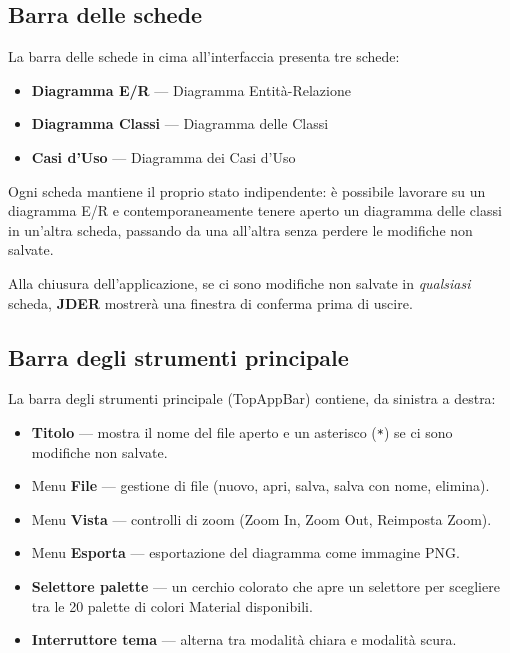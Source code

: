 \documentclass[a4paper,11pt]{article}
\newcommand{\uielement}[1]{\textbf{#1}}
\newcommand{\jder}{\textbf{JDER}}
\begin{document}
\subsection{Barra delle schede}

La barra delle schede in cima all'interfaccia presenta tre schede:

\begin{itemize}
  \item \uielement{Diagramma E/R} --- Diagramma Entità-Relazione
  \item \uielement{Diagramma Classi} --- Diagramma delle Classi
  \item \uielement{Casi d'Uso} --- Diagramma dei Casi d'Uso
\end{itemize}

Ogni scheda mantiene il proprio stato indipendente: è possibile lavorare su un diagramma E/R e
contemporaneamente tenere aperto un diagramma delle classi in un'altra scheda, passando da una
all'altra senza perdere le modifiche non salvate.

\begin{tcolorbox}[notebox, title={Nota}]
  Alla chiusura dell'applicazione, se ci sono modifiche non salvate in \emph{qualsiasi} scheda,
  \jder{} mostrerà una finestra di conferma prima di uscire.
\end{tcolorbox}

\subsection{Barra degli strumenti principale}

La barra degli strumenti principale (TopAppBar) contiene, da sinistra a destra:

\begin{itemize}
  \item \textbf{Titolo} --- mostra il nome del file aperto e un asterisco (\texttt{*}) se ci sono
        modifiche non salvate.
  \item Menu \uielement{File} --- gestione di file (nuovo, apri, salva, salva con nome, elimina).
  \item Menu \uielement{Vista} --- controlli di zoom (Zoom In, Zoom Out, Reimposta Zoom).
  \item Menu \uielement{Esporta} --- esportazione del diagramma come immagine PNG.
  \item \textbf{Selettore palette} --- un cerchio colorato che apre un selettore per scegliere
        tra le 20 palette di colori Material disponibili.
  \item \textbf{Interruttore tema} --- alterna tra modalità chiara e modalità scura.
\end{itemize}
\end{document}
